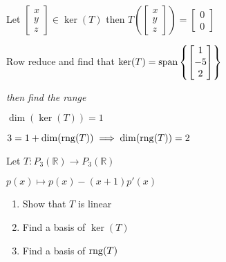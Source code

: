 \begin{sol}
	Let $\begin{bmatrix}
		x\\y\\z
	\end{bmatrix} \in \ker(T)$ then $T\left(\begin{bmatrix}
		x\\y\\z
	\end{bmatrix}\right) = \begin{bmatrix}
		0\\0
	\end{bmatrix}$

	Row reduce and find that $\ker(T) = \mathrm{span}\left\{\begin{bmatrix}
		1\\-5\\2
	\end{bmatrix}\right\}$

	\textit{then find the range}

	$\dim(\ker(T)) = 1$

	$3 = 1 + \dim(\mathrm{rng}(T)) \implies \dim(\mathrm{rng}(T)) = 2$
\end{sol}

\begin{example}
	Let $T: P_3(\mathbb{R}) \to P_3(\mathbb{R})$

	$p(x) \mapsto p(x) - (x+1) p'(x)$

	\begin{enumerate}
		\item Show that $T$ is linear
		\item Find a basis of $\ker(T)$
		\item Find a basis of $\mathrm{rng}(T)$
	\end{enumerate}
\end{example}

